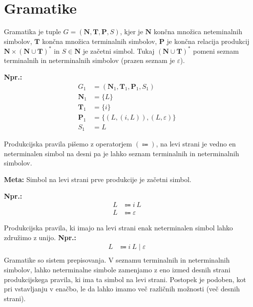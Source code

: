 \documentclass{article}
\newcommand{\Ex}{\textbf{Npr.:}\ }
\newcommand{\Special}[1]{\textbf{#1}}
\newcommand{\Set}[1]{\mathbf{#1}}
\newcommand{\Grammar}{G}
\newcommand{\Terminals}{\Set{T}}
\newcommand{\NonTerminals}{\Set{N}}
\newcommand{\Productions}{\Set{P}}
\newcommand{\StartSymbol}{S}
\newcommand{\Null}{\varepsilon}
\newcommand{\Arrow}{\Coloneqq}
\newcommand{\Seq}{\ }
\newcommand{\Union}{\mathrel{|}}
\newcommand{\Kleene}[1]{#1^\ast}
\begin{document}

\section{Gramatike}
Gramatika je tuple $\Grammar = (\NonTerminals, \Terminals, \Productions, \StartSymbol)$, kjer je $\NonTerminals$ končna množica neteminalnih simbolov, $\Terminals$ končna množica terminalnih simbolov, $\Productions$ je končna relacija produkcij $\NonTerminals \times \Kleene{(\NonTerminals \cup \Terminals)}$ in $\StartSymbol \in \NonTerminals$ je začetni simbol.
Tukaj $\Kleene{(\NonTerminals \cup \Terminals)}$ pomeni seznam terminalnih in neterminalnih simbolov (prazen seznam je $\Null$).

\Ex
\begin{align*}
  \Grammar_1 &= (\NonTerminals_1, \Terminals_1, \Productions_1, \StartSymbol_1) \\
  \NonTerminals_1 &= \{L\}\\
  \Terminals_1 &= \{i\}\\
  \Productions_1 &= \{ (L, (i, L)), (L, \Null) \}\\
  \StartSymbol_1 &= L
\end{align*}

Produkcijska pravila pišemo z operatorjem $(\Arrow)$, na levi strani je vedno en neterminalen simbol na desni pa je lahko seznam terminalnih in neterminalnih simbolov.

\Special{Meta:} Simbol na levi strani prve produkcije je začetni simbol.

\Ex
\begin{equation}
  \tag{$\Grammar_1$}
  \label{g:listi}
  \begin{aligned}
    L &\Arrow i \Seq L\\
    L &\Arrow \Null
  \end{aligned}
\end{equation}

Produkcijska pravila, ki imajo na levi strani enak neterminalen simbol lahko združimo z unijo.
\Ex
\begin{align*}
  L &\Arrow i \Seq L \Union \Null\\
\end{align*}
Gramatike so sistem prepisovanja.
V seznamu terminalnih in neterminalnih simbolov, lahko neterminalne simbole zamenjamo z eno izmed desnih strani produkcijskega pravila, ki ima ta simbol na levi strani.
Postopek je podoben, kot pri vstavljanju v enačbo, le da lahko imamo več različnih možnosti (več desnih strani).
\end{document}
